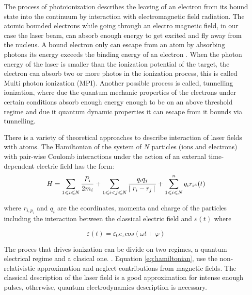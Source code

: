 The process of photoionization describes the leaving of an electron from its bound state  into the continuum by interaction with electromagnetic field radiation\cite{berkowitz_photoabsorption_1979}. The atomic bounded electrons while going through an electro magnetic field, in our case the laser beam,  can absorb enough  energy to get excited and fly away from the nucleus. A bound electron only can escape from an atom by absorbing photons its energy exceeds the binding energy of an electron \cite{einstein_uber_1905}. When the photon energy of the laser is smaller than the ionization potential of the target, the electron can absorb two or more photos in the ionization process, this is called Multi photon ionization (MPI). Another possible process is called, tunnelling ionization, where due the quantum mechanic properties of the electrons under certain conditions absorb enough energy enough to be on an above threshold regime and due it quantum dynamic properties it can escape from it bounds via tunnelling.

There is a variety of theoretical approaches to describe interaction of  laser fields with atoms. The Hamiltonian of the system of $N$ particles (ions and electrons) with pair-wise Coulomb interactions under the action of an external time-dependent electric field has the form:
\begin{equation}  \label{eq:hamiltonian}
\centering
H = \displaystyle\sum_{1 \leqslant i \leqslant N}^{} \dfrac{P_{i}}{2m_{i}} + \displaystyle\sum_{1 \leqslant i < j \leqslant N}^{} \dfrac{q_{i}q_{j}}{\mid r_{i}-r_{j} \mid} + \displaystyle\sum_{1 \leqslant i \leqslant N}^{n} q_{i}r_{i}\varepsilon(t)
\end{equation}

where $ r_{i,  p_{i}} $ and $ q_{i} $ are the coordinates, momenta and charge of the particles including the interaction between the classical electric field and $ \varepsilon(t) $ where \cite{mikaberidze_atomic_1981}

\begin{equation}
\varepsilon(t) = \varepsilon_{0} e_{z}cos(\omega t + \varphi)
\end{equation}

The proces that drives ionization can be divide on two regimes, a quantum electrical regime and a clasical one. \cite{karnakov_strong_2009}. Equation \ref{eq:hamiltonian}, use the non-relativistic approximation and neglect contributions from magnetic fields. The classical description of the laser field is a good approximation
for intense enough pulses, otherwise, quantum electrodynamics description is necessary.

